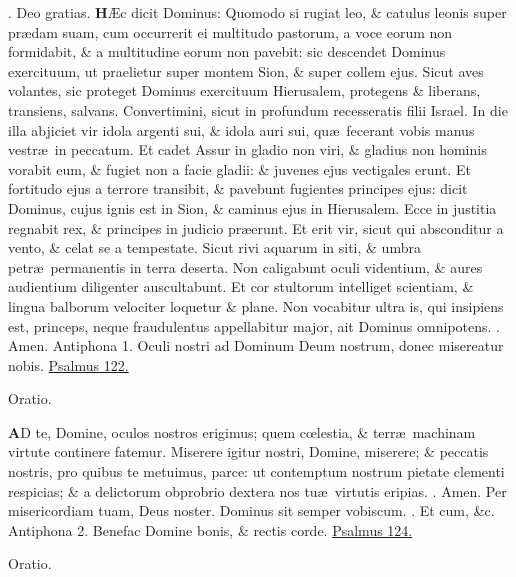 \documentclass[letter,11pt]{book}
\makeatletter
\DeclareRobustCommand{\Rbar}{\vers@resp{0pt}{R}}
\newcommand{\vers@resp@sym}{\raisebox{0.2ex}{\rotatebox[origin=c]{-20}{$\m@th\rceil$}}}
\newcommand{\vers@resp}[2]{%
  {\ooalign{\hidewidth\kern#1\vers@resp@sym\hidewidth\cr#2\cr}}%
}%
\def\R{\color{Red} \Rbar . \color{black}}
\makeatother
\begin{document}
\begin{multicols*}{2}
\par \noindent \R Deo gratias.
\lettrine[lines=2]{\bfseries \color{Red} H}{}\AE c dicit Dominus: Quomodo si rugiat leo, \& catulus leonis super pr\ae dam suam, cum occurrerit ei multitudo pastorum, a voce eorum non formidabit, \& a multitudine eorum non pavebit: sic descendet Dominus exercituum, ut praelietur super montem Sion, \& super collem ejus. Sicut aves volantes, sic proteget Dominus exercituum Hierusalem, protegens \& liberans, transiens, salvans. Convertimini, sicut in profundum recesseratis filii Israel. In die illa abjiciet vir idola argenti sui, \& idola auri sui, qu\ae \ fecerant vobis manus vestr\ae \ in peccatum. Et cadet Assur in gladio non viri, \& gladius non hominis vorabit eum, \& fugiet non a facie gladii: \& juvenes ejus vectigales erunt. Et fortitudo ejus a terrore transibit, \& pavebunt fugientes principes ejus: dicit Dominus, cujus ignis est in Sion, \& caminus ejus in Hierusalem. Ecce in justitia regnabit rex, \& principes in judicio pr\ae erunt.
Et erit vir, sicut qui absconditur a vento, \& celat se a tempestate. Sicut rivi aquarum in siti, \& umbra petr\ae \ permanentis in terra deserta. Non caligabunt oculi videntium, \& aures audientium diligenter auscultabunt. Et cor stultorum intelliget scientiam, \& lingua balborum velociter loquetur \& plane. Non vocabitur ultra is, qui insipiens est, princeps, neque fraudulentus appellabitur major, ait Dominus omnipotens. \R Amen.
\newline \color{Red} Antiphona 1. \color{black} Oculi nostri ad Dominum Deum nostrum, donec misereatur nobis. \color{Red} \hyperlink{ps122}{Psalmus 122.} \color{black}
\vspace{-.5em} \begin{center} \color{Red} Oratio. \color{black} \end{center} \vspace{-.5em}
\lettrine[lines=2]{\bfseries \color{Red} A}{}D te, Domine, oculos nostros erigimus; quem c\oe lestia, \& terr\ae \ machinam virtute continere fatemur. Miserere igitur nostri, Domine, miserere; \& peccatis nostris, pro quibus te metuimus, parce: ut contemptum nostrum pietate clementi respicias; \& a delictorum obprobrio dextera nos tu\ae \ virtutis eripias. \R Amen. Per misericordiam tuam, Deus noster. Dominus sit semper vobiscum. \R Et cum, \&c.
\newline \color{Red} Antiphona 2. \color{black} Benefac Domine bonis, \& rectis corde. \color{Red} \hyperlink{ps124}{Psalmus 124.} \color{black}
\vspace{-.5em} \begin{center} \color{Red} Oratio. \color{black} \end{center} \vspace{-.5em}

\end{multicols*}
\end{document}
